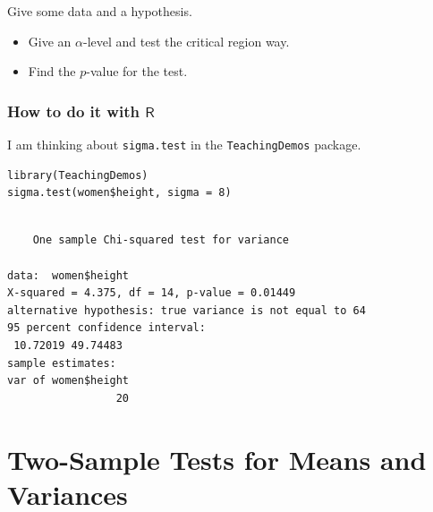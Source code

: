 \documentclass[captions=tableheading]{scrbook}
\begin{document}
\begin{example}
Give some data and a hypothesis.
\begin{itemize}
\item Give an \(\alpha\)-level and test the critical region way.
\item Find the \(p\)-value for the test.
\end{itemize}
\end{example}
\subsubsection{How to do it with \(\mathsf{R}\)}
\label{sec-10-3-2-1}

I am thinking about \texttt{sigma.test} in the \texttt{TeachingDemos} package.


\begin{verbatim}
library(TeachingDemos)
sigma.test(women$height, sigma = 8)
\end{verbatim}


\begin{verbatim}

	One sample Chi-squared test for variance

data:  women$height 
X-squared = 4.375, df = 14, p-value = 0.01449
alternative hypothesis: true variance is not equal to 64 
95 percent confidence interval:
 10.72019 49.74483 
sample estimates:
var of women$height 
                 20
\end{verbatim}
\section{Two-Sample Tests for Means and Variances}
\label{sec-10-4}
\label{sec-Two-Sample-Tests-for-Means}
\end{document}
